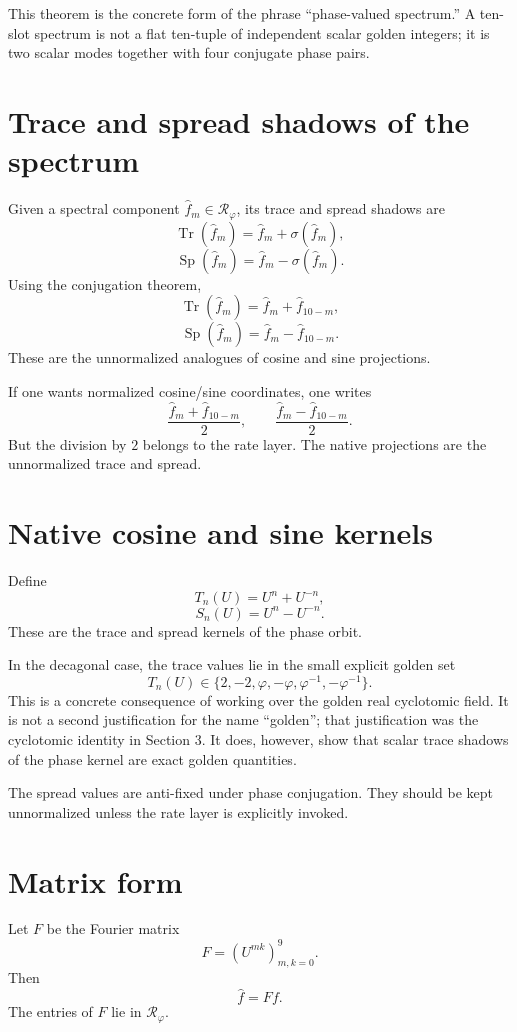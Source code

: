 \documentclass[11pt]{article}
\newcommand{\Tr}{\operatorname{Tr}}
\newcommand{\Sp}{\operatorname{Sp}}
\newcommand{\ph}{\varphi}
\newcommand{\RR}{\mathcal R_\ph}
\newcommand{\sig}{\sigma}
\begin{document}
This theorem is the concrete form of the phrase ``phase-valued spectrum.''  A ten-slot spectrum is not a flat ten-tuple of independent scalar golden integers; it is two scalar modes together with four conjugate phase pairs.

\section{Trace and spread shadows of the spectrum}

Given a spectral component $\widehat f_m\in\RR$, its trace and spread shadows are
\[
    \Tr(\widehat f_m)=\widehat f_m+\sig(\widehat f_m),
\]
\[
    \Sp(\widehat f_m)=\widehat f_m-\sig(\widehat f_m).
\]
Using the conjugation theorem,
\[
    \Tr(\widehat f_m)=\widehat f_m+\widehat f_{10-m},
\]
\[
    \Sp(\widehat f_m)=\widehat f_m-\widehat f_{10-m}.
\]
These are the unnormalized analogues of cosine and sine projections.

If one wants normalized cosine/sine coordinates, one writes
\[
    \frac{\widehat f_m+\widehat f_{10-m}}2,
    \qquad
    \frac{\widehat f_m-\widehat f_{10-m}}2.
\]
But the division by $2$ belongs to the rate layer.  The native projections are the unnormalized trace and spread.

\section{Native cosine and sine kernels}

Define
\[
    T_n(U)=U^n+U^{-n},
\]
\[
    S_n(U)=U^n-U^{-n}.
\]
These are the trace and spread kernels of the phase orbit.

In the decagonal case, the trace values lie in the small explicit golden set
\[
    T_n(U)\in\{2,-2,\ph,-\ph,\ph^{-1},-\ph^{-1}\}.
\]
This is a concrete consequence of working over the golden real cyclotomic field.  It is not a second justification for the name ``golden''; that justification was the cyclotomic identity in Section 3.  It does, however, show that scalar trace shadows of the phase kernel are exact golden quantities.

The spread values are anti-fixed under phase conjugation.  They should be kept unnormalized unless the rate layer is explicitly invoked.

\section{Matrix form}

Let $F$ be the Fourier matrix
\[
    F=(U^{mk})_{m,k=0}^{9}.
\]
Then
\[
    \widehat f=Ff.
\]
The entries of $F$ lie in $\RR$.
\end{document}
